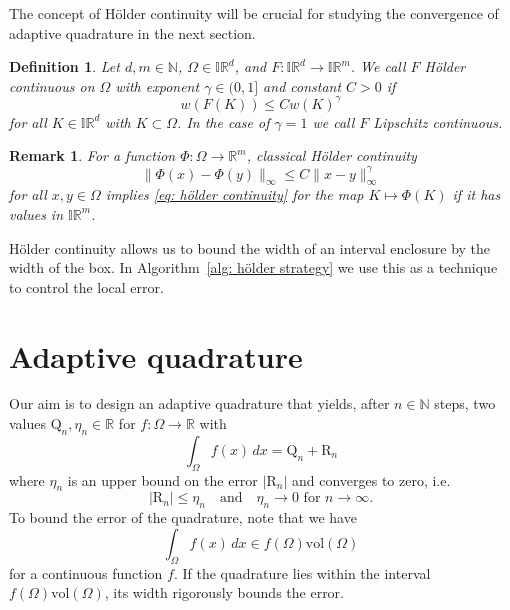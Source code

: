 \documentclass[a4paper, 11pt]{article}
\newtheorem{definition}[theorem]{Definition}
\newtheorem{remark}[theorem]{Remark}
\newcommand{\vol}{\mathrm{vol}}
\begin{document}
	
	The concept of Hölder continuity will be crucial for studying the convergence of adaptive quadrature in the next section.
	
	\begin{definition}
		Let $d,m \in \mathbb{N}$, $\Omega \in \mathbb{IR}^d$, and $F: \mathbb{IR}^d  \to \mathbb{IR}^m$. We call $F$ Hölder continuous on $\Omega$ with exponent $\gamma \in (0,1]$ and constant $C>0$ if
		\begin{equation}\label{eq: hölder continuity}
			w(F(K)) \leq C w(K)^\gamma
		\end{equation}
		for all $K\in\mathbb{IR}^d$ with $K\subset \Omega$. In the case of $\gamma = 1$ we call $F$ Lipschitz continuous.
	\end{definition}
	
	\begin{remark}\label{rem: hölder continuity}
		For a function $\Phi: \Omega \to \mathbb{R}^m$, classical Hölder continuity
		$$ \|\Phi(x) - \Phi(y)\|_\infty \leq C \|x-y\|_\infty^\gamma $$
		for all $x,y \in \Omega$ implies \eqref{eq: hölder continuity} for the map $K \mapsto \Phi(K)$ if it has values in $\mathbb{IR}^m$.
	\end{remark}

    Hölder continuity allows us to bound the width of an interval enclosure by the width of the box. In Algorithm~\ref{alg: hölder strategy} we use this as a technique to control the local error. 
	
	
	\section{Adaptive quadrature}
	
	Our aim is to design an adaptive quadrature that {yields, after} $n\in \mathbb{N}$ steps{,} two values $\mathrm{Q}_n, \eta_n \in \mathbb{R}$ for $f:\Omega \to \mathbb{R}$ with
	\begin{equation}
		\int_\Omega f(x) \, dx = \mathrm{Q}_n + \mathrm{R}_n
	\end{equation}
	where $\eta_n$ is {an upper bound on} the error $|\mathrm{R}_n|$ and converges to zero, i.e.
	\begin{equation}\label{eq: goal}
		|\mathrm{R}_n| \leq \eta_n \quad \text{and} \quad \eta_n \to 0 \text{  for  }n \to \infty.
	\end{equation}
	To bound the error of the quadrature, note that we have
	$$\int_\Omega f(x) \, dx \in f(\Omega) \vol(\Omega) $$
	for a continuous function $f$. If the quadrature lies within the interval $f(\Omega)\vol(\Omega)$, its width rigorously bounds the error.
	
\end{document}
